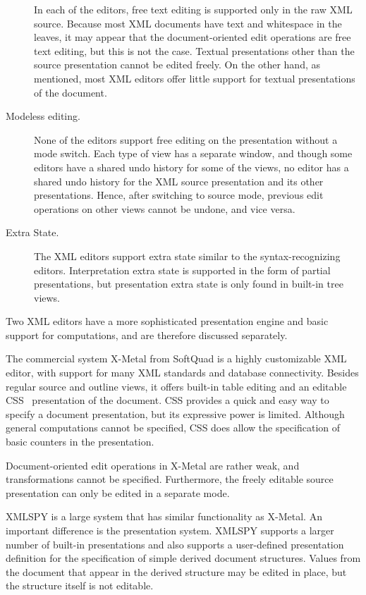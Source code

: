 \begin{description}
In each of the editors, free text editing is supported only in the raw XML source. Because most XML documents have text and whitespace in the leaves, it may appear that the document-oriented edit operations are free text editing, but this is not the case. Textual presentations other than the source presentation cannot be edited freely. On the other hand, as mentioned, most XML editors offer little support for textual presentations of the document. 

\item[Modeless editing.]
None of the editors support free editing on the presentation without a mode switch. Each type of view has a separate window, and though some editors have a shared undo history for some of the views, no editor has a shared undo history for the XML source presentation and its other presentations. Hence, after switching to source mode, previous edit operations on other views cannot be undone, and vice versa.

\item[Extra State.]
The XML editors support extra state similar to the syntax-recognizing editors. Interpretation extra state is supported in the form of partial presentations, but presentation extra state is only found in built-in tree views.

\end{description}

Two XML editors have a more sophisticated presentation engine and basic support for computations, and are therefore discussed separately.


The commercial system X-Metal from SoftQuad is a highly customizable XML editor, with support for many XML standards and database connectivity. Besides regular source and outline views, it offers built-in table editing and an editable CSS~\cite{css2} presentation of the document. CSS provides a quick and easy way to specify a document presentation, but its expressive power is limited. Although general computations cannot be specified, CSS does allow the specification of basic counters in the presentation. 

Document-oriented edit operations in X-Metal are rather weak, and transformations cannot be specified. Furthermore, the freely editable source presentation can only be edited in a separate mode.


XMLSPY is a large system that has similar functionality as X-Metal. An important difference is the presentation system. XMLSPY supports a larger number of built-in presentations and also supports a user-defined presentation definition for the specification of simple derived document structures. Values from the document that appear in the derived structure may be edited in place, but the structure itself is not editable.

